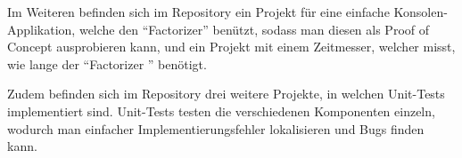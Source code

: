 Im Weiteren befinden sich im Repository ein Projekt für eine einfache Konsolen-Applikation, welche den "`Factorizer"' benützt, sodass man diesen als Proof of Concept ausprobieren kann, und ein Projekt mit einem Zeitmesser, welcher misst, wie lange der "`Factorizer "' benötigt.

Zudem befinden sich im Repository drei weitere Projekte, in welchen Unit-Tests implementiert sind. Unit-Tests testen die verschiedenen Komponenten einzeln, wodurch man einfacher Implementierungsfehler lokalisieren und Bugs finden kann.